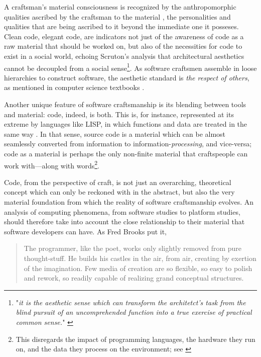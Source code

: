 A craftsman's material consciousness is recognized by the anthropomorphic qualities ascribed by the craftsman to the material \citep{sennett_craftsman_2009}, the personalities and qualities that are being ascribed to it beyond the immediate one it posseses. Clean code, elegant code, are indicators not just of the awareness of code as a raw material that should be worked on, but also of the necessities for code to exist in a social world, echoing Scruton's analysis that architectural aesthetics cannot be decoupled from a social sense\footnote{"\emph{it is the aesthetic sense which can transform the architetct's task from the blind pursuit of an uncomprehended function into a true exercise of practical common sense.}" \citep{scruton_aesthetics_2013}}. As software craftsmen assemble in loose hierarchies to construct software, the aesthetic standard is \emph{the respect of others}, as mentioned in computer science textbooks \citep{abelson_structure_1979}.

Another unique feature of software craftsmanship is its blending between tools and material: code, indeed, is both. This is, for instance, represented at its extreme by languages like LISP, in which functions and data are treated in the same way \citep{mccarthy_lisp_1965}. In that sense, source code is a material which can be almost seamlessly converted from information to information-\emph{processing}, and vice-versa; code as a material is perhaps the only non-finite material that craftspeople can work with—along with words\footnote{This disregards the impact of programming languages, the hardware they run on, and the data they process on the environment; see \citep{kurp_green_2008}}.

Code, from the perspective of craft, is not just an overarching, theoretical concept which can only be reckoned with in the abstract, but also the very material foundation from which the reality of software craftsmanship evolves. An analysis of computing phenomena, from software studies to platform studies, should therefore take into account the close relationship to their material that software developers can have. As Fred Brooks put it,

\begin{quote}
    The programmer, like the poet, works only slightly removed from pure thought-stuff. He builds his castles in the air, from air, creating by exertion of the imagination. Few media of creation are so flexible, so easy to polish and rework, so readily capable of realizing grand conceptual structures. \citep{brooksjr_mythical_1975}
\end{quote}

